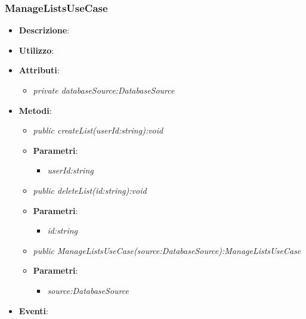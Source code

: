 \subsubsection{ManageListsUseCase}
\begin{itemize}
\item \textbf{Descrizione}: 
\item \textbf{Utilizzo}:
\item \textbf{Attributi}: 
	\begin{itemize}
	\item \textit{private databaseSource:DatabaseSource}\\
	
	\end{itemize}
\item \textbf{Metodi}:
	\begin{itemize}
	\item \textit{public createList(userId:string):void}\\

			\item{\textbf{Parametri}: \begin{itemize}
			\item \textit{userId:string}\\

			\end{itemize}}
	\item \textit{public deleteList(id:string):void}\\

			\item{\textbf{Parametri}: \begin{itemize}
			\item \textit{id:string}\\

			\end{itemize}}
	\item \textit{public ManageListsUseCase(source:DatabaseSource):ManageListsUseCase}\\
	
		\item{\textbf{Parametri}: \begin{itemize}
			\item \textit{source:DatabaseSource}\\
			
			\end{itemize}}
	\end{itemize}
\item \textbf{Eventi}:
\end{itemize}

